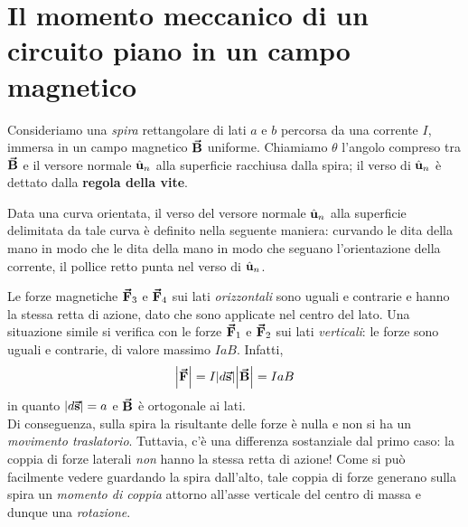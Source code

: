 \section{Il momento meccanico di un circuito piano in un campo magnetico}\label{spirarettangolaremeccanica}
Consideriamo una \textit{spira} rettangolare di lati $a$ e $b$ percorsa da una corrente $I$, immersa in un campo magnetico $\vb*{\va{B}}$ uniforme. Chiamiamo $\theta$ l'angolo compreso tra $\vb*{\va{B}}$ e il versore normale $\hat{\mathbf{u}}_n$ alla superficie racchiusa dalla spira; il verso di $\hat{\mathbf{u}}_n$ è dettato dalla \textbf{regola della vite}.
\begin{define}
	Data una curva orientata, il verso del versore normale $\hat{\mathbf{u}}_n$ alla superficie delimitata da tale curva è definito nella seguente maniera: curvando le dita della mano in modo che le dita della mano in modo che seguano l'orientazione della corrente, il pollice retto punta nel verso di $\hat{\mathbf{u}}_n$.
\end{define}
Le forze magnetiche $\vb*{\va{F}}_3$ e $\vb*{\va{F}}_4$ sui lati \textit{orizzontali} sono uguali e contrarie e hanno la stessa retta di azione, dato che sono applicate nel centro del lato.
Una situazione simile si verifica con le forze $\vb*{\va{F}}_{1}$ e $\vb*{\va{F}}_2$ sui lati \textit{verticali}: le forze sono uguali e contrarie, di valore massimo $IaB$. Infatti,
	\begin{equation*}
		\abs{\vb*{\va{F}}}=I\abs{d\vb*{\va{s}}}\abs{\vb*{\va{B}}}=IaB
	\end{equation*}
in quanto $\abs{d\vb*{\va{s}}}=a$ e $\vb*{\va{B}}$ è ortogonale ai lati.\\ 
Di conseguenza, sulla spira la risultante delle forze è nulla e non si ha un \textit{movimento traslatorio}.
Tuttavia, c'è una differenza sostanziale dal primo caso: la coppia di forze laterali \textit{non} hanno la stessa retta di azione! Come si può facilmente vedere guardando la spira dall'alto, tale coppia di forze generano sulla spira un \textit{momento di coppia} attorno all'asse verticale del centro di massa e dunque una \textit{rotazione}.

